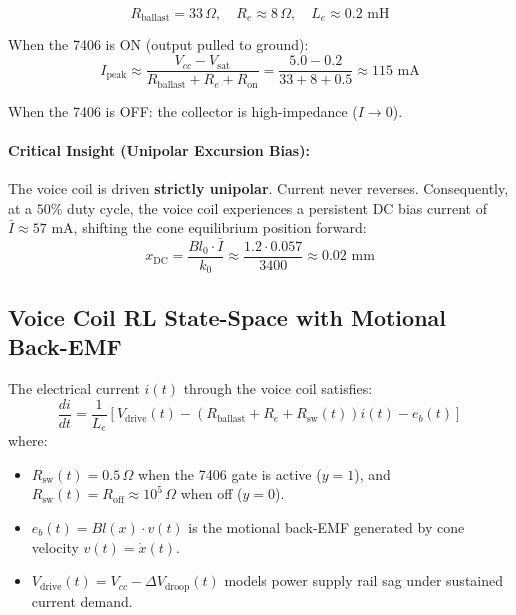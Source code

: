 \documentclass[11pt,a4paper]{article}
\begin{document}
\begin{equation}
R_{\text{ballast}} = 33\,\Omega, \quad R_e \approx 8\,\Omega, \quad L_e \approx 0.2\text{ mH}
\end{equation}

When the 7406 is ON (output pulled to ground):
\begin{equation}
I_{\text{peak}} \approx \frac{V_{cc} - V_{\text{sat}}}{R_{\text{ballast}} + R_e + R_{\text{on}}} = \frac{5.0 - 0.2}{33 + 8 + 0.5} \approx 115\text{ mA}
\end{equation}

When the 7406 is OFF: the collector is high-impedance ($I \to 0$).

\paragraph{Critical Insight (Unipolar Excursion Bias):} The voice coil is driven \textbf{strictly unipolar}. Current never reverses. Consequently, at a $50\%$ duty cycle, the voice coil experiences a persistent DC bias current of $\bar{I} \approx 57\text{ mA}$, shifting the cone equilibrium position forward:
\begin{equation}
x_{\text{DC}} = \frac{Bl_0 \cdot \bar{I}}{k_0} \approx \frac{1.2 \cdot 0.057}{3400} \approx 0.02\text{ mm}
\end{equation}

\subsection{Voice Coil RL State-Space with Motional Back-EMF}
The electrical current $i(t)$ through the voice coil satisfies:
\begin{equation}
\frac{di}{dt} = \frac{1}{L_e} \left[ V_{\text{drive}}(t) - \left( R_{\text{ballast}} + R_e + R_{\text{sw}}(t) \right) i(t) - e_b(t) \right]
\end{equation}
where:
\begin{itemize}
    \item $R_{\text{sw}}(t) = 0.5\,\Omega$ when the 7406 gate is active ($y = 1$), and $R_{\text{sw}}(t) = R_{\text{off}} \approx 10^5\,\Omega$ when off ($y = 0$).
    \item $e_b(t) = Bl(x) \cdot v(t)$ is the motional back-EMF generated by cone velocity $v(t) = \dot{x}(t)$.
    \item $V_{\text{drive}}(t) = V_{cc} - \Delta V_{\text{droop}}(t)$ models power supply rail sag under sustained current demand.
\end{itemize}
\end{document}
